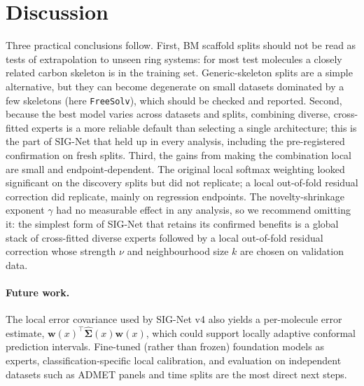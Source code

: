 \documentclass[journal=jcisd8,manuscript=article]{achemso}
\begin{document}
\section{Discussion}
Three practical conclusions follow. First, BM scaffold splits should not be read as tests of extrapolation to unseen ring systems: for most test molecules a closely related carbon skeleton is in the training set. Generic-skeleton splits are a simple alternative, but they can become degenerate on small datasets dominated by a few skeletons (here \texttt{FreeSolv}), which should be checked and reported. Second, because the best model varies across datasets and splits, combining diverse, cross-fitted experts is a more reliable default than selecting a single architecture; this is the part of SIG-Net that held up in every analysis, including the pre-registered confirmation on fresh splits. Third, the gains from making the combination local are small and endpoint-dependent. The original local softmax weighting looked significant on the discovery splits but did not replicate; a local out-of-fold residual correction did replicate, mainly on regression endpoints. The novelty-shrinkage exponent $\gamma$ had no measurable effect in any analysis, so we recommend omitting it: the simplest form of SIG-Net that retains its confirmed benefits is a global stack of cross-fitted diverse experts followed by a local out-of-fold residual correction whose strength $\nu$ and neighbourhood size $k$ are chosen on validation data.

\paragraph{Future work.}
The local error covariance used by SIG-Net v4 also yields a per-molecule error estimate, $\mathbf{w}(x)^\top\hat{\boldsymbol{\Sigma}}(x)\mathbf{w}(x)$, which could support locally adaptive conformal prediction intervals. Fine-tuned (rather than frozen) foundation models as experts, classification-specific local calibration, and evaluation on independent datasets such as ADMET panels and time splits\cite{sheridan2013timesplit} are the most direct next steps.
\end{document}
